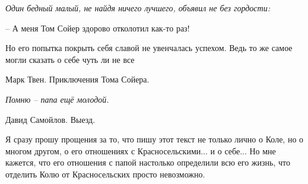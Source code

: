 

\vzmscaption


\begin{flushright}
{\it Один бедный малый, не найдя ничего лучшего, объявил не без гордости:

 – А меня Том Сойер здорово отколотил как-то раз!

 Но его попытка покрыть себя  славой  не  увенчалась успехом. Ведь то же
 самое могли сказать о себе чуть ли не все }

Марк Твен. Приключения Тома Сойера.

{\it Помню – папа ещё молодой.}

Давид Самойлов. Выезд.
\end{flushright}

Я сразу прошу прощения  за то, что пишу этот текст не только лично о Коле, но о многом другом, о его отношениях с Красносельскими... и о себе... Но мне кажется, что его отношения с папой настолько определили всю его жизнь, что отделить Колю от Красносельских просто невозможно.


